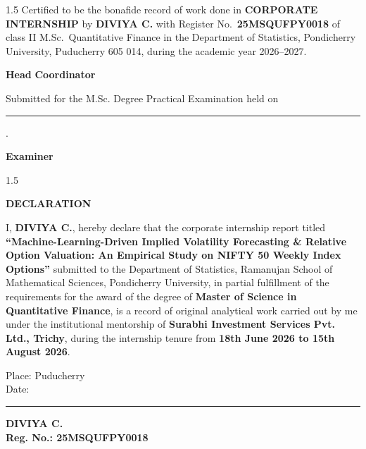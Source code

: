 \documentclass[11pt,oneside]{report}
\begin{document}
\begin{spacing}{1.5}
\noindent{}
Certified to be the bonafide record of work done in \textbf{CORPORATE INTERNSHIP} by \textbf{DIVIYA C.} with Register No.~\textbf{25MSQUFPY0018} of class II M.Sc.~Quantitative Finance in the Department of Statistics, Pondicherry University, Puducherry 605 014, during the academic year 2026--2027.
\end{spacing}

\vspace{3.5cm}
\noindent
\textbf{Head} \hfill \textbf{Coordinator}

\vspace{2.2cm}
\noindent
Submitted for the M.Sc. Degree Practical Examination held on \rule{4.5cm}{0.4pt}.

\vspace{2.2cm}
\hfill
\textbf{Examiner}



\newpage
\thispagestyle{plain}
{}
\begin{spacing}{1.5}
\begin{center}
    \textbf{\Large DECLARATION} \\[0.6cm]
\end{center}

\noindent
I, \textbf{DIVIYA C.}, hereby declare that the corporate internship report titled \textbf{``Machine-Learning-Driven Implied Volatility Forecasting \& Relative Option Valuation: An Empirical Study on NIFTY 50 Weekly Index Options''} submitted to the Department of Statistics, Ramanujan School of Mathematical Sciences, Pondicherry \mbox{University}, in partial fulfillment of the requirements for the award of the degree of \textbf{Master of Science in Quantitative Finance}, is a record of original analytical work carried out by me under the institutional mentorship of \textbf{Surabhi Investment Services Pvt. Ltd., Trichy}, during the internship tenure from \textbf{18th June 2026 to 15th August 2026}.

\vspace{3.5cm}
\noindent
\begin{minipage}{0.45\textwidth}
    Place: Puducherry \\
    Date: \rule{3.5cm}{0.4pt}
\end{minipage}
\hfill
\begin{minipage}{0.45\textwidth}
    \begin{flushright}
        \textbf{DIVIYA C.} \\
        \textbf{Reg. No.: 25MSQUFPY0018}
    \end{flushright}
\end{minipage}
\end{spacing}
\end{document}
